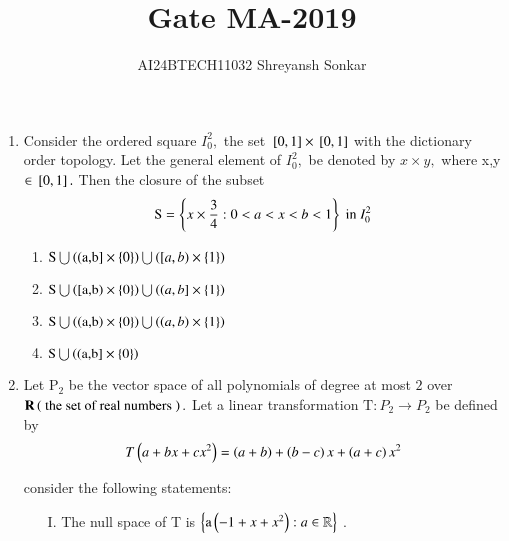 \documentclass[journal]{IEEEtran}
\begin{document}

\vspace{3cm}


\renewcommand{\thefigure}{\theenumi}
\renewcommand{\thetable}{\theenumi}
\setlength{\intextsep}{10pt} %


\renewcommand{\thetable}{\theenumi}

\title{Gate MA-2019}
\author{AI24BTECH11032 Shreyansh Sonkar
}
\maketitle
\renewcommand{\thefigure}{\theenumi}
\renewcommand{\thetable}{\theenumi}
\begin{enumerate} [start=40]
    \item Consider the ordered square $I_{0}^{2},$ the set ${}\left[0,1\right]\times{}\left[0,1\right]$ with the dictionary order topology. Let the general element of   $I_{0}^{2},$ be denoted by $x\times y,$ where x,y$\in{}\left[0,1\right].$ Then the closure of the subset
    \begin{align*}
        \text{S}=\left\{x\times\frac{3}{4}:0<a<x<b<1\right\}\text{ in } I_{0}^{2}
    \end{align*}
\begin{multicols}{2}
    \begin{enumerate}
         \item $\text{S}\bigcup\left((\text{a,b}]\times\left\{0\right\}\right)\bigcup\left([a,b)\times\left\{1\right\}\right)$
         \item  $\text{S}\bigcup\left([\text{a,b})\times\left\{0\right\}\right)\bigcup\left((a,b]\times\left\{1\right\}\right)$
         \item $\text{S}\bigcup\left(\left(\text{a,b}\right)\times\left\{0\right\}\right)\bigcup\left(\left(a,b\right)\times\left\{1\right\}\right)$
        \item $\text{S}\bigcup\left((\text{a,b}]\times\left\{0\right\}\right)$
    \end{enumerate}
\end{multicols}   
\bigskip
\item Let $\text{P}_{2}$ be the vector space of all polynomials of degree at most $2$ over $\textbf{R}\left(\text{ the set of real numbers }\right).$ Let a linear transformation  $\text{T}:P_{2}\to P_{2}$ be defined by 
\begin{align*}
    T\left(a+bx+cx^{2}\right)=\left(a+b\right)+\left(b-c\right)x+\left(a+c\right)x^{2}
\end{align*}

consider the following statements:
\begin{itemize}
    \item[I.] The null space of  T is $\left\{\text{a}\left(-1 + x + x^{2}\right) : a \in \mathbb{R}\right\}$ .
    

\end{itemize}
\end{enumerate}
\end{document}

